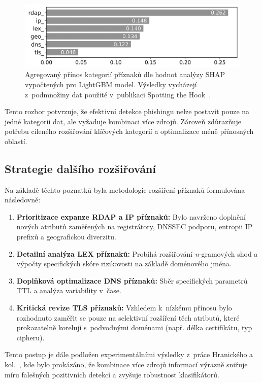 \begin{figure}[h]
    \centering
    \includegraphics[width=\linewidth,clip]{obrazky-figures/cropped_shap.png}
    \caption{Agregovaný přínos kategorií příznaků dle hodnot analýzy SHAP vypočtených pro LightGBM model. Výsledky vycházejí z~podmnožiny dat použité v~publikaci Spotting the Hook~\cite{CNSM}.}
    \label{fig:aggregated-shap}
\end{figure}

Tento rozbor potvrzuje, že efektivní detekce phishingu nelze postavit pouze na jedné kategorii dat, ale vyžaduje kombinaci více zdrojů. Zároveň zdůrazňuje potřebu cíleného rozšiřování klíčových kategorií a optimalizace méně přínosných oblastí.


\subsection{Strategie dalšího rozšiřování}

Na základě těchto poznatků byla metodologie rozšíření příznaků formulována následovně:

\begin{enumerate} \item \textbf{Prioritizace expanze RDAP a IP příznaků:} Bylo navrženo doplnění nových atributů zaměřených na registrátory, DNSSEC podporu, entropii IP prefixů a geografickou diverzitu. \item \textbf{Detailní analýza LEX příznaků:} Probíhá rozšiřování \textit{n}-gramových shod a výpočty specifických skóre rizikovosti na základě doménového jména. \item \textbf{Doplňková optimalizace DNS příznaků:} Sběr specifických parametrů TTL a analýza variability v~čase. \item \textbf{Kritická revize TLS příznaků:} Vzhledem k~nízkému přínosu bylo rozhodnuto zaměřit se pouze na selektivní rozšíření těch atributů, které prokazatelně korelují s~podvodnými doménami (např. délka certifikátu, typ cipheru). \end{enumerate}

\noindent Tento postup je dále podložen experimentálními výsledky z~práce Hranického a kol. \cite{CNSM}, kde bylo prokázáno, že kombinace více zdrojů informací výrazně snižuje míru falešných pozitivních detekcí a zvyšuje robustnost klasifikátorů.

